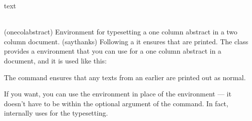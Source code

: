 \begin{syntax}
 text  \\
\cmd{\saythanks} \\
\end{syntax}
\glossary(onecolabstract)%
  {}%
  {Environment for typesetting a one column abstract in a two column document.}
\glossary(saythanks)%
  {}%
  {Following a  it ensures that  are printed.}
The class provides a  environment that you can use
for a one column abstract in a  document, 
and it is used like this:
The command \cmd{\saythanks} ensures that any \cmd{\thanks} texts from
an earlier \cmd{\maketitle} are printed out as normal.

    If you want, you can use the  environment in place
of the  environment --- it doesn't have to be within the 
optional argument of the \cmd{\twocolumn} command. In fact, 
 internally uses  for the typesetting.




